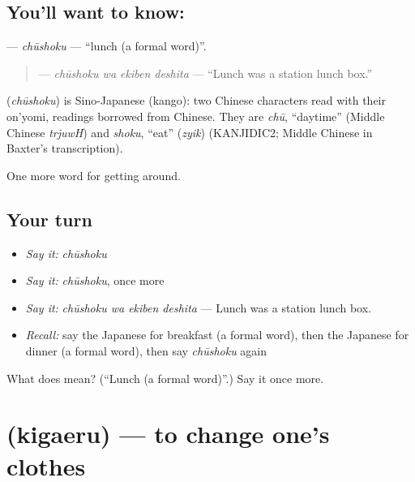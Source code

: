 \subsection*{You'll want to know: }
\textbf{} — \emph{chūshoku} — \textquotedblleft{}lunch (a formal word)\textquotedblright{}.

\begin{quote}
\textbf{ } — \emph{chūshoku wa ekiben deshita} — \textquotedblleft{}Lunch was a station lunch box.\textquotedblright{}
\end{quote}

\begin{cousinweb}
\textbf{} (\emph{chūshoku}) is Sino-Japanese (kango): two Chinese characters read with their on'yomi, readings borrowed from Chinese. They are \emph{chū}, \textquotedblleft{}daytime\textquotedblright{} (Middle Chinese \emph{trjuwH}) and \emph{shoku}, \textquotedblleft{}eat\textquotedblright{} (\emph{zyik}) (KANJIDIC2; Middle Chinese in Baxter's transcription).
\end{cousinweb}

\begin{grammarlens}[title={What you've built}]
One more word for getting around.
\end{grammarlens}

\subsection*{Your turn}
\begin{itemize}
\raggedright
  \item \emph{Say it:} \emph{chūshoku}
  \item \emph{Say it:} \emph{chūshoku}, once more
  \item \emph{Say it:} \emph{chūshoku wa ekiben deshita} — Lunch was a station lunch box.
  \item \emph{Recall:} say the Japanese for breakfast (a formal word), then the Japanese for dinner (a formal word), then say \emph{chūshoku} again
\end{itemize}

\begin{tcolorbox}[breakable,colback=teal!4,colframe=teal!35!black,title={Before you move on}]
What does  mean? (\textquotedblleft{}Lunch (a formal word)\textquotedblright{}.) Say it once more.
\end{tcolorbox}
\section[\texorpdfstring{\ja{きがえる} (kigaeru)}{きがえる (kigaeru)}]{ (kigaeru) — to change one's clothes}

